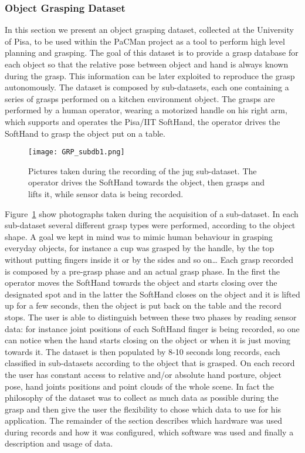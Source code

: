 
\subsubsection{Object Grasping Dataset}
\label{sec:ObjectGraspingDataset}

In this section we present an object grasping dataset, collected at the University of Pisa, to be used within the PaCMan project as a tool to perform high level planning and grasping.
The goal of this dataset is to provide a grasp database for each object so that the relative pose between object and hand is always known during the grasp. This information can be later 
exploited to reproduce the grasp autonomously. 
The dataset is composed by sub-datasets, each one containing a series of grasps performed on a kitchen environment object. The grasps are performed by a human operator, wearing
a motorized handle on his right arm, which supports and operates the Pisa/IIT SoftHand, the operator drives the SoftHand to grasp the object put on a table. 
\begin{figure}[!tb]
  \centering
  \texttt{[image: GRP\_subdb1.png]}
  \caption{Pictures taken during the recording of the jug sub-dataset. The operator drives the SoftHand towards the object, then grasps and lifts it, while sensor data is being recorded.}
  \label{fig:grasp:subdb1}
\end{figure}
Figure~\ref{fig:grasp:subdb1} show photographs taken during the acquisition of a sub-dataset.
In each sub-dataset several different grasp types were performed, according to the object shape. A goal we kept in mind was to mimic human behaviour in grasping everyday objects, for instance a cup was grasped by the handle, 
by the top without putting fingers inside it or by the sides and so on\ldots
Each grasp recorded is composed by a pre-grasp phase and an actual grasp phase. In the first the operator moves the SoftHand towards the object and starts closing over the designated spot and in the latter the SoftHand 
closes on the object and it is lifted up for a few seconds, then the object is put back on the table and the record stops. The user is able to distinguish between these two phases by reading sensor data: for instance joint positions
of each SoftHand finger is being recorded, so one can notice when the hand starts closing on the object or when it is just moving towards it.
The dataset is then populated by 8-10 seconds long records, each classified in sub-datasets according to the object that is grasped. On each record the user has constant access to relative and/or absolute hand posture, object pose,
hand joints positions and point clouds of the whole scene. In fact the philosophy of the dataset was to collect as much data as possible during the grasp and then give the user the flexibility to chose which data to use for his application.
The remainder of the section describes which hardware was used during records and how it was configured, which software was used and finally a description and usage of data.

